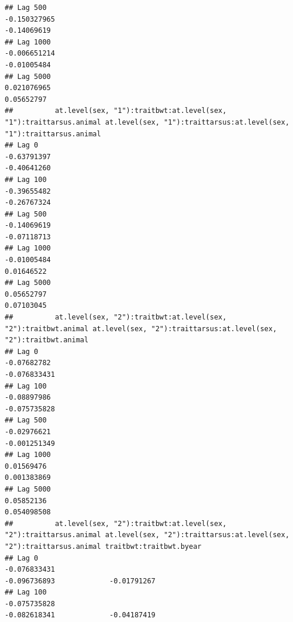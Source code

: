 \documentclass[
  12pt,
]{book}
\begin{document}
\begin{verbatim}
## Lag 500                                                    -0.150327965                                                       -0.14069619
## Lag 1000                                                   -0.006651214                                                       -0.01005484
## Lag 5000                                                    0.021076965                                                        0.05652797
##          at.level(sex, "1"):traitbwt:at.level(sex, "1"):traittarsus.animal at.level(sex, "1"):traittarsus:at.level(sex, "1"):traittarsus.animal
## Lag 0                                                          -0.63791397                                                          -0.40641260
## Lag 100                                                        -0.39655482                                                          -0.26767324
## Lag 500                                                        -0.14069619                                                          -0.07118713
## Lag 1000                                                       -0.01005484                                                           0.01646522
## Lag 5000                                                        0.05652797                                                           0.07103045
##          at.level(sex, "2"):traitbwt:at.level(sex, "2"):traitbwt.animal at.level(sex, "2"):traittarsus:at.level(sex, "2"):traitbwt.animal
## Lag 0                                                       -0.07682782                                                      -0.076833431
## Lag 100                                                     -0.08897986                                                      -0.075735828
## Lag 500                                                     -0.02976621                                                      -0.001251349
## Lag 1000                                                     0.01569476                                                       0.001383869
## Lag 5000                                                     0.05852136                                                       0.054098508
##          at.level(sex, "2"):traitbwt:at.level(sex, "2"):traittarsus.animal at.level(sex, "2"):traittarsus:at.level(sex, "2"):traittarsus.animal traitbwt:traitbwt.byear
## Lag 0                                                         -0.076833431                                                         -0.096736893             -0.01791267
## Lag 100                                                       -0.075735828                                                         -0.082618341             -0.04187419

\end{verbatim}
\end{document}
